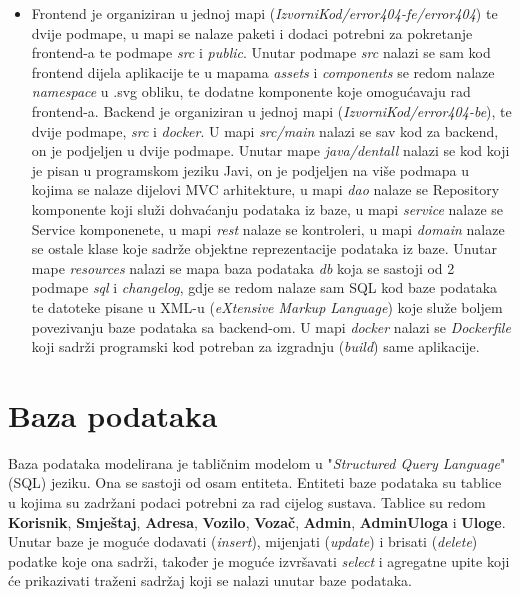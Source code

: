 \begin{itemize}
		\item 
		Frontend je organiziran u jednoj mapi (\textit{IzvorniKod/error404-fe/error404}) te dvije podmape, u mapi se nalaze paketi i dodaci potrebni za pokretanje frontend-a te podmape \textit{src} i \textit{public}. Unutar podmape \textit{src} nalazi se sam kod frontend dijela aplikacije te u mapama \textit{assets} i \textit{components} se redom nalaze \textit{namespace} u .svg obliku, te dodatne komponente koje omogućavaju rad frontend-a. \newline Backend je organiziran u jednoj mapi (\textit{IzvorniKod/error404-be}), te dvije podmape, \textit{src} i \textit{docker}. U mapi \textit{src/main} nalazi se sav kod za backend, on je podjeljen u dvije podmape. Unutar mape \textit{java/dentall} nalazi se kod koji je pisan u programskom jeziku Javi, on je podjeljen na više podmapa u kojima se nalaze dijelovi MVC arhitekture, u mapi \textit{dao} nalaze se Repository komponente koji služi dohvaćanju podataka iz baze, u mapi \textit{service} nalaze se Service komponenete, u mapi \textit{rest} nalaze se kontroleri, u mapi \textit{domain} nalaze se ostale klase koje sadrže objektne reprezentacije podataka iz baze. Unutar mape \textit{resources} nalazi se mapa baza podataka \textit{db} koja se sastoji od 2 podmape \textit{sql} i \textit{changelog}, gdje se redom nalaze sam SQL kod baze podataka te datoteke pisane u XML-u (\textit{eXtensive Markup Language}) koje služe boljem povezivanju baze podataka sa backend-om. U mapi \textit{docker} nalazi se \textit{Dockerfile} koji sadrži programski kod potreban za izgradnju (\textit{build}) same aplikacije.
		
		
	\end{itemize}
		\section{Baza podataka}
			
			
		
		{Baza podataka modelirana je tabličnim modelom u "\textit{Structured Query Language}" (SQL) jeziku. Ona se sastoji od osam entiteta. Entiteti baze podataka su tablice u kojima su zadržani podaci potrebni za rad cijelog sustava. Tablice su redom \textbf{Korisnik}, \textbf{Smještaj}, \textbf{Adresa}, \textbf{Vozilo}, \textbf{Vozač}, \textbf{Admin}, \textbf{AdminUloga} i \textbf{Uloge}. Unutar baze je moguće dodavati (\textit{insert}), mijenjati (\textit{update}) i brisati (\textit{delete}) podatke koje ona sadrži, također je moguće izvršavati \textit{select} i agregatne upite koji će prikazivati traženi sadržaj koji se nalazi unutar baze podataka.}
		
